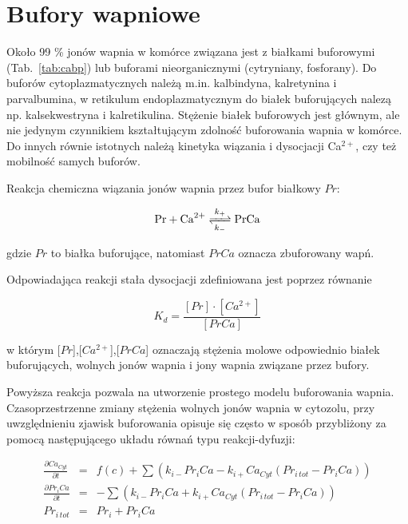 \section{Bufory wapniowe}\label{ch:bufory}

Około 99 \% jonów wapnia w komórce związana jest z białkami buforowymi (Tab.~\ref{tab:cabp}) lub buforami nieorganicznymi (cytryniany, fosforany). Do buforów cytoplazmatycznych należą m.in. kalbindyna, kalretynina i parvalbumina, w retikulum endoplazmatycznym do białek buforujących nalezą np. kalsekwestryna i kalretikulina. Stężenie białek buforowych jest głównym, ale nie jedynym czynnikiem kształtującym zdolność buforowania wapnia w komórce. Do innych równie istotnych należą kinetyka wiązania i dysocjacji Ca$^{2+}$, czy też mobilność samych buforów.

Reakcja chemiczna wiązania jonów wapnia przez bufor białkowy $Pr$:

\begin{equation}
\ce{Pr + Ca^{2+} <=>[k_+][k_-] PrCa}
\end{equation}

\noindent gdzie $Pr$ to białka buforujące, natomiast $PrCa$ oznacza zbuforowany wapń.

Odpowiadająca reakcji stała dysocjacji zdefiniowana jest poprzez równanie

\begin{equation}
K_d = \frac{[Pr]\cdot[Ca^{2+}]}{[PrCa]}
\end{equation}

\noindent w którym [$Pr$],[$Ca^{2+}$],[$PrCa$] oznaczają stężenia molowe odpowiednio białek buforujących, wolnych jonów wapnia i jony wapnia związane przez bufory.

Powyższa reakcja pozwala na utworzenie prostego modelu buforowania wapnia. Czasoprzestrzenne zmiany stężenia wolnych jonów wapnia w cytozolu, przy uwzględnieniu zjawisk buforowania opisuje się często w sposób przybliżony za pomocą następującego układu równań typu reakcji-dyfuzji:

\begin{footnotesize}
\begin{eqnarray}
\frac{\partial{Ca_{Cyt}}}{\partial{t}} &=& f(c) + \sum (k_{i-}Pr_iCa-k_{i+}Ca_{Cyt} (Pr_{i\, tot}-Pr_iCa))\\[.3em]
\frac{\partial{Pr_iCa}}{\partial{t}} &=& - \sum (k_{i-}Pr_iCa + k_{i+}Ca_{Cyt} (Pr_{i\, tot}-Pr_iCa))\\[.3em]
Pr_{i\, tot} &=& Pr_i + Pr_iCa
\end{eqnarray}
\end{footnotesize}

